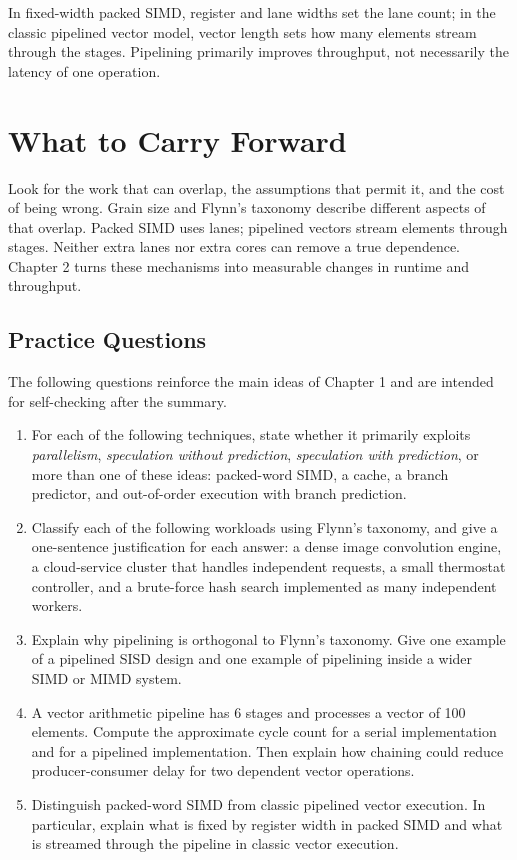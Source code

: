In fixed-width packed SIMD, register and lane widths set the lane count; in the classic pipelined vector model, vector length sets how many elements stream through the stages.
Pipelining primarily improves throughput, not necessarily the latency of one operation.


\section{What to Carry Forward}\label{sec:auto-009}
Look for the work that can overlap, the assumptions that permit it, and the cost of being wrong.
Grain size and Flynn's taxonomy describe different aspects of that overlap.
Packed SIMD uses lanes; pipelined vectors stream elements through stages.
Neither extra lanes nor extra cores can remove a true dependence.
Chapter 2 turns these mechanisms into measurable changes in runtime and throughput.


\begin{samepage}
\section{Practice Questions}\label{sec:ch1-practice}
The following questions reinforce the main ideas of Chapter 1 and are intended for self-checking after the summary.
\begin{enumerate}
    \item For each of the following techniques, state whether it primarily exploits \emph{parallelism}, \emph{speculation without prediction}, \emph{speculation with prediction}, or more than one of these ideas: packed-word SIMD, a cache, a branch predictor, and out-of-order execution with branch prediction.
    \item Classify each of the following workloads using Flynn's taxonomy, and give a one-sentence justification for each answer: a dense image convolution engine, a cloud-service cluster that handles independent requests, a small thermostat controller, and a brute-force hash search implemented as many independent workers.
    \item Explain why pipelining is orthogonal to Flynn's taxonomy.
    Give one example of a pipelined SISD design and one example of pipelining inside a wider SIMD or MIMD system.
    \item A vector arithmetic pipeline has 6 stages and processes a vector of 100 elements.
    Compute the approximate cycle count for a serial implementation and for a pipelined implementation.
    Then explain how chaining could reduce producer-consumer delay for two dependent vector operations.
    \item Distinguish packed-word SIMD from classic pipelined vector execution.
    In particular, explain what is fixed by register width in packed SIMD and what is streamed through the pipeline in classic vector execution.
\end{enumerate}
\end{samepage}
